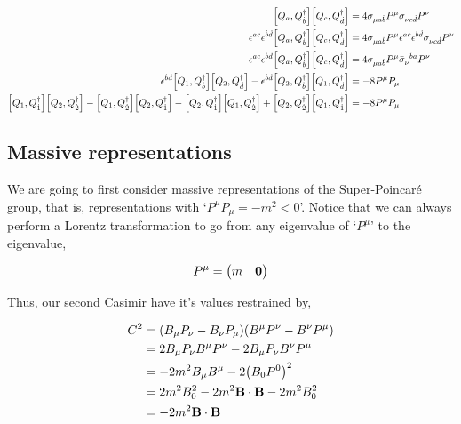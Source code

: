 \begin{align}
    \comm{Q_a}{Q^\dagger_{\dot b}}\comm{Q_c}{Q^\dagger_{\dot d}}&=4\sigma_{\mu a\dot{ b}}P^\mu\sigma_{\nu c\dot{ d}}P^\nu\nonumber\\
    \epsilon^{ac}\epsilon^{\dot b\dot d}\comm{Q_a}{Q^\dagger_{\dot b}}\comm{Q_c}{Q^\dagger_{\dot d}}&=4\sigma_{\mu a\dot b}P^\mu\epsilon^{ac}\epsilon^{\dot b\dot d}\sigma_{\nu c\dot d}P^\nu\nonumber\\
    \epsilon^{ac}\epsilon^{\dot b\dot d}\comm{Q_a}{Q^\dagger_{\dot b}}\comm{Q_c}{Q^\dagger_{\dot d}}&=4\sigma_{\mu a\dot b}P^\mu\tensor{{\bar\sigma}}{_\nu ^{\dot b}^a}P^\nu\nonumber\\
    \epsilon^{\dot b\dot d}\comm{Q_1}{Q^\dagger_{\dot b}}\comm{Q_2}{Q^\dagger_{\dot d}}-\epsilon^{\dot b\dot d}\comm{Q_2}{Q^\dagger_{\dot b}}\comm{Q_1}{Q^\dagger_{\dot d}}&=-8P^\mu P_\mu\nonumber\\
    \comm{Q_1}{Q^\dagger_{\dot 1}}\comm{Q_2}{Q^\dagger_{\dot 2}}-\comm{Q_1}{Q^\dagger_{\dot 2}}\comm{Q_2}{Q^\dagger_{\dot 1}}-\comm{Q_2}{Q^\dagger_{\dot 1}}\comm{Q_1}{Q^\dagger_{\dot 2}}+\comm{Q_2}{Q^\dagger_{\dot 2}}\comm{Q_1}{Q^\dagger_{\dot 1 }}&=-8P^\mu P_\mu\nonumber
\end{align}

\subsection{Massive representations}

We are going to first consider massive representations of the Super-Poincaré group, that is, representations with `$P^\mu P_\mu =-m^2<0$'. Notice that we can always perform a Lorentz transformation to go from any eigenvalue of `$P^\mu$' to the eigenvalue,

\begin{align}
    P^\mu=\mqty(m&\vb 0)\nonumber
\end{align}

Thus, our second Casimir have it's values restrained by,

\begin{align}
    C^2&=\qty(B_\mu P_\nu-B_\nu P_\mu)\qty(B^\mu P^\nu -B^\nu P^\mu)\nonumber\\
    &=2 B_\mu P_\nu B^\mu P^\nu -2B_\mu P_\nu B^\nu P^\mu\nonumber\\
    &=-2m^2B_\mu B^\mu-2\qty(B_0 P^0)^2\nonumber\\
    &=2m^2B_0^2-2m^2\vb B\cdot \vb B-2m^2B_0^2\nonumber\\
    &=-2m^2\vb B\cdot \vb B\nonumber
\end{align}

